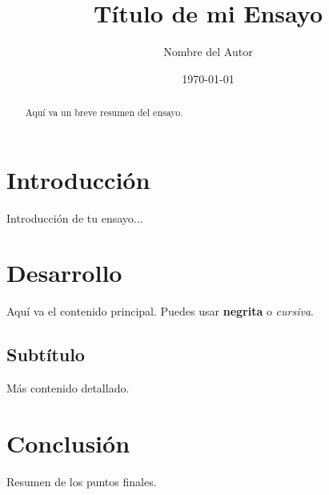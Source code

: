 \documentclass[12pt, a4paper]{article} %
\title{Título de mi Ensayo}
\author{Nombre del Autor}
\date{\today} %
\begin{document}
\maketitle %

\begin{abstract}
Aquí va un breve resumen del ensayo.
\end{abstract}

\section{Introducción}
Introducción de tu ensayo...

\section{Desarrollo}
Aquí va el contenido principal. Puedes usar \textbf{negrita} o \textit{cursiva}.

\subsection{Subtítulo}
Más contenido detallado.

\section{Conclusión}
Resumen de los puntos finales.
\end{document}
